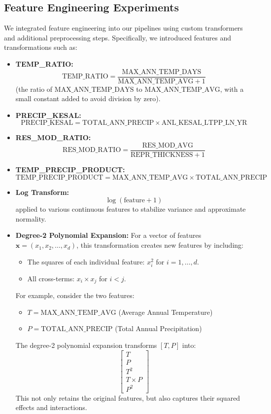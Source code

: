 \documentclass{article}
\begin{document}
\subsection{Feature Engineering Experiments}
We integrated feature engineering into our pipelines using custom transformers and additional preprocessing steps. Specifically, we introduced features and transformations such as:
\begin{itemize}
    \item \textbf{TEMP\_RATIO:} 
    \[
    \text{TEMP\_RATIO} = \frac{\text{MAX\_ANN\_TEMP\_DAYS}}{\text{MAX\_ANN\_TEMP\_AVG} + 1}
    \]
    (the ratio of \(\text{MAX\_ANN\_TEMP\_DAYS}\) to \(\text{MAX\_ANN\_TEMP\_AVG}\), with a small constant added to avoid division by zero).

    \item \textbf{PRECIP\_KESAL:} 
    \[
    \text{PRECIP\_KESAL} = \text{TOTAL\_ANN\_PRECIP} \times \text{ANL\_KESAL\_LTPP\_LN\_YR}
    \]

    \item \textbf{RES\_MOD\_RATIO:} 
    \[
    \text{RES\_MOD\_RATIO} = \frac{\text{RES\_MOD\_AVG}}{\text{REPR\_THICKNESS} + 1}
    \]

    \item \textbf{TEMP\_PRECIP\_PRODUCT:} 
    \[
    \text{TEMP\_PRECIP\_PRODUCT} = \text{MAX\_ANN\_TEMP\_AVG} \times \text{TOTAL\_ANN\_PRECIP}
    \]

    \item \textbf{Log Transform:} 
    \[
    \log(\text{feature} + 1)
    \]
    applied to various continuous features to stabilize variance and approximate normality.

    \item \textbf{Degree-2 Polynomial Expansion:} For a vector of features 
    \(\mathbf{x} = (x_1, x_2, \ldots, x_d)\), this transformation creates new features by including:
    \begin{itemize}
        \item The squares of each individual feature: \(x_i^2\) for \(i = 1, \dots, d\).
        \item All cross-terms: \(x_i \times x_j\) for \(i < j\).
    \end{itemize}
    For example, consider the two features:
    \begin{itemize}
        \item \( T = \text{MAX\_ANN\_TEMP\_AVG} \) (Average Annual Temperature)
        \item \( P = \text{TOTAL\_ANN\_PRECIP} \) (Total Annual Precipitation)
    \end{itemize}
    The degree-2 polynomial expansion transforms \([T, P]\) into:
    \[
    \begin{bmatrix}
    T \\
    P \\
    T^2 \\
    T \times P \\
    P^2
    \end{bmatrix}
    \]
    This not only retains the original features, but also captures their squared effects and interactions.

\end{itemize}
\end{document}
